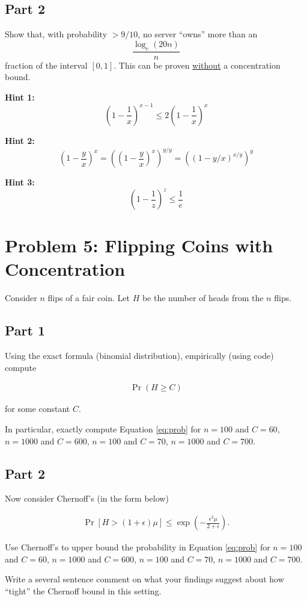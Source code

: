 \documentclass{article}
\begin{document}
\subsection*{Part 2}
Show that, with probability $>9/10$, no server ``owns'' more than an $$\frac{\log_e (20 n)}{n}$$ fraction of the interval $[0,1]$. 
This can be proven \underline{without} a concentration bound.

\textbf{Hint 1:} $$\left(1-\frac1{x}\right)^{x-1} \leq 2\left(1-\frac1{x}\right)^x$$

\textbf{Hint 2:} $$\left(1-\frac{y}{x}\right)^x=\left(\left(1-\frac{y}{x}\right)^x\right)^{y/y} = \left(\left(1-y/x\right)^{x/y}\right)^y$$

\textbf{Hint 3:} $$\left(1-\frac1{z}\right)^z \leq \frac1{e}$$

%

\newpage \section*{Problem 5: Flipping Coins with Concentration}

Consider $n$ flips of a fair coin. Let $H$ be the number of heads from the $n$ flips.

\subsection*{Part 1}

Using the exact formula (binomial distribution), empirically (using code) compute 

\begin{align}\label{eq:prob}
\Pr( H \geq C)
\end{align}

for some constant $C$.

In particular, exactly compute Equation \ref{eq:prob} for $n=100$ and $C=60$, $n=1000$ and $C=600$, $n=100$ and $C=70$, $n=1000$ and $C=700$.

\subsection*{Part 2}
Now consider Chernoff's (in the form below)

\begin{align*}
	\Pr[H > (1+\epsilon)\mu] \leq \exp \left(-\frac{\epsilon^2\mu}{2+\epsilon}\right).
\end{align*}

Use Chernoff's to upper bound the probability in Equation \ref{eq:prob} for $n=100$ and $C=60$, $n=1000$ and $C=600$, $n=100$ and $C=70$, $n=1000$ and $C=700$.

Write a several sentence comment on what your findings suggest about how ``tight'' the Chernoff bound in this setting.

%
\end{document}
